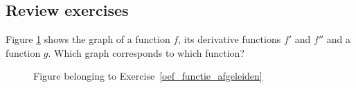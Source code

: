 \subsection*{Review exercises}
\begin{Exercise}[difficulty = 2, label = oef_functie_afgeleiden] Figure \ref{fig_behaviour_31} shows the graph of a function $f$, its derivative functions $f'$ and $f''$ and a function $g$. Which graph corresponds to which function? 
\begin{figure}[H]
\centerline{
\hspace{0.1cm}
}
\centerline{
\hspace{0.1cm}
}
\caption{Figure belonging to Exercise~\ref{oef_functie_afgeleiden}}
\label{fig_behaviour_31}
\end{figure}
\end{Exercise}

